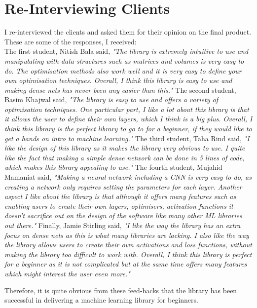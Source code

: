 \section{Re-Interviewing Clients}
I re-interviewed the clients and asked them for their opinion on the final product. These are some of the responses, I received:
\\
The first student, Nitish Bala said, \textit{"The library is extremely intuitive to use and manipulating with data-structures such as matrices and volumes is very easy to do. The optimisation methods also work well and it is very easy to define your own optimisation techniques. Overall, I think this library is easy to use and making dense nets has never been any easier than this."}
\bigbreak
The second student, Basim Khajwal said, \textit{"The library is easy to use and offers a variety of optimisation techniques. One particular part, I like a lot about this library is that it allows the user to define their own layers, which I think is a big plus. Overall, I think this library is the perfect library to go to for a beginner, if they would like to get a hands on intro to machine learning."}
\bigbreak
The third student, Taha Rind said, \textit{"I like the design of this library as it makes the library very obvious to use. I quite like the fact that making a simple dense network can be done in 5 lines of code, which makes this library appealing to use."}
\bigbreak
The fourth student, Mujahid Mamaniat said, \textit{"Making a neural network including a CNN is very easy to do, as creating a network only requires setting the parameters for each layer. Another aspect I like about the library is that although it offers many features such as enabling users to create their own layers, optimisers, activation functions it doesn't sacrifice out on the design of the software like many other ML libraries out there."}
\bigbreak
Finally, Jamie Stirling said, \textit{"I like the way the library has an extra focus on dense nets as this is what many libraries are lacking. I also like the way the library allows users to create their own activations and loss functions, without making the library too difficult to work with. Overall, I think this library is perfect for a beginner as it is not complicated but at the same time offers many features which might interest the user even more."}
\bigbreak

Therefore, it is quite obvious from these feed-backs that the library has been successful in delivering a machine learning library for beginners.